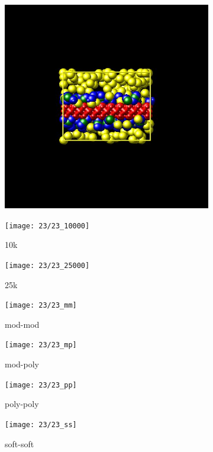 \documentclass[a4paper]{article}
\begin{document}
\begin{figure}[H]
\begin{subfigure}{0.3\textwidth}
  \centering
  \includegraphics[width=\linewidth,keepaspectratio]{start}
  \caption{}
\end{subfigure}
\begin{subfigure}{0.3\textwidth}
  \centering
  \texttt{[image: 23/23\_10000]}
  \caption{10k}
\end{subfigure}
\begin{subfigure}{0.3\textwidth}
  \centering
  \texttt{[image: 23/23\_25000]}
  \caption{25k}
\end{subfigure}
\caption{}
\label{fig_1}
\end{figure}

\begin{figure}[H]
\begin{subfigure}{0.24\textwidth}
  \centering
  \texttt{[image: 23/23\_mm]}
  \caption{mod-mod}
\end{subfigure}
\begin{subfigure}{0.24\textwidth}
  \centering
  \texttt{[image: 23/23\_mp]}
  \caption{mod-poly}
\end{subfigure}
\begin{subfigure}{0.24\textwidth}
  \centering
  \texttt{[image: 23/23\_pp]}
  \caption{poly-poly}
\end{subfigure}
\begin{subfigure}{0.24\textwidth}
  \centering
  \texttt{[image: 23/23\_ss]}
  \caption{soft-soft}
\end{subfigure}
\caption{}
\label{fig_1}
\end{figure}
\end{document}
